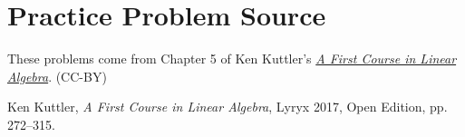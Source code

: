 \documentclass{ximera}
\begin{document}
\section*{Practice Problem Source}
These problems come from Chapter 5 of Ken Kuttler's \href{https://open.umn.edu/opentextbooks/textbooks/a-first-course-in-linear-algebra-2017}{\it A First Course in Linear Algebra}. (CC-BY)

Ken Kuttler, {\it  A First Course in Linear Algebra}, Lyryx 2017, Open Edition, pp. 272--315.   
\end{document}
